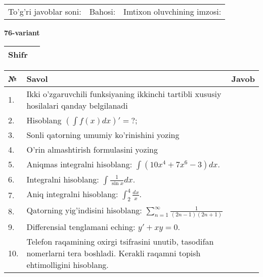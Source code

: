 \documentclass{article}
\begin{document}
  \vspace{1cm}
  
  \begin{tabular}{lll}
  To'g'ri javoblar soni: \underline{\hspace{1.5cm}} & 
  Bahosi: \underline{\hspace{1.5cm}} & 
  Imtixon oluvchining imzosi: \underline{\hspace{2cm}} \\
  \end{tabular}
  
  \egroup
  
  \newpage
  
  
  \textbf{76-variant}\\
  
  \bgroup
  \def\arraystretch{1.6} %
  
  \begin{tabular}{|m{5.7cm}|m{9.5cm}|}
  \hline
  Shifr & \\
  \hline
  \end{tabular}
  
  \vspace{1cm}
  
  \begin{tabular}{|m{0.7cm}|m{10cm}|m{4cm}|}
  \hline
  № & Savol & Javob \\
  \hline
  1. & Ikki o'zgaruvchili funksiyaning ikkinchi tartibli xususiy hosilalari qanday belgilanadi &  \\
  \hline
  2. & Hisoblang \(\left( \int {f(x)dx} \right)' = ?\); &  \\
  \hline
  3. & Sonli qatorning umumiy ko'rinishini yozing &  \\
  \hline
  4. & O'rin almashtirish formulasini yozing &  \\
  \hline
  5. & Aniqmas integralni hisoblang: \(\int {\left( 10x^{4} + 7x^{6} - 3 \right)dx}\). &  \\
  \hline
  6. & Integralni hisoblang: \(\int {\frac{1}{\sin x}dx}\). &  \\
  \hline
  7. & Aniq integralni hisoblang: \(\int_{2}^{4}\frac{dx}{x}\). &  \\
  \hline
  8. & Qatorning yig'indisini hisoblang: \(\sum_{n = 1}^{\infty}\frac{1}{(2n - 1)(2n + 1)}\) &  \\
  \hline
  9. & Differensial tenglamani eching: \(y' + xy = 0\). &  \\
  \hline
  10. & Telefon raqamining oxirgi tsifrasini unutib, tasodifan nomerlarni tera boshladi. Kerakli raqamni topish ehtimolligini hisoblang. &  \\
  \hline
  \end{tabular}
  
\end{document}
